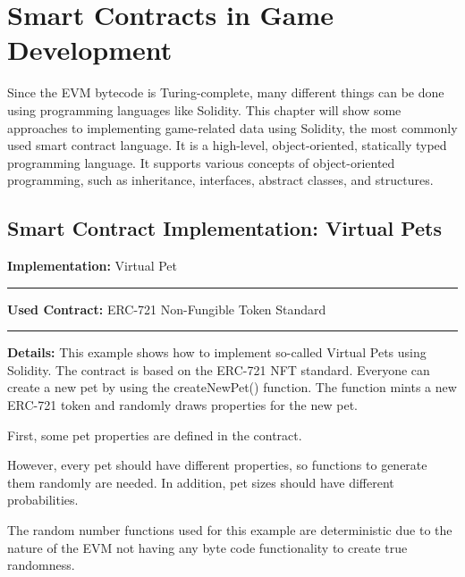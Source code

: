\section{Smart Contracts in Game Development}
Since the EVM bytecode is Turing-complete, many different things can be done using programming languages like Solidity.
This chapter will show some approaches to implementing game-related data using Solidity, the most commonly used smart contract language.
It is a high-level, object-oriented, statically typed programming language.
It supports various concepts of object-oriented programming, such as inheritance, interfaces, abstract classes, and structures.

\clearpage
\subsection{Smart Contract Implementation: Virtual Pets}

\begin{framed}
\textbf{Implementation: } Virtual Pet \medskip \hrule \medskip
\textbf{Used Contract: } ERC-721 Non-Fungible Token Standard\medskip \hrule \medskip
\textbf{Details:}  This example shows how to implement so-called Virtual Pets using Solidity.
The contract is based on the ERC-721 NFT standard. 
Everyone can create a new pet by using the createNewPet() function.
The function mints a new ERC-721 token and randomly draws properties for the new pet.
\end{framed}
First, some pet properties are defined in the contract.


However, every pet should have different properties, so functions to generate them randomly are needed.
In addition, pet sizes should have different probabilities.



The random number functions used for this example are deterministic due to the nature of the EVM not having any byte code functionality to create true randomness.


